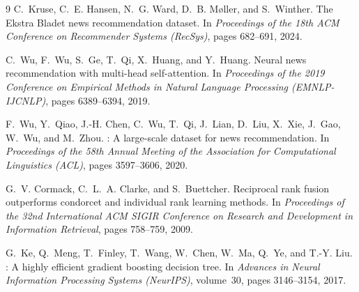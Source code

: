 \documentclass[11pt,a4paper]{article}
\begin{document}
\vspace{-4pt}
\begin{thebibliography}{9}
\footnotesize
\setlength{\itemsep}{0pt}
\setlength{\parskip}{0pt}
C.~Kruse, C.~E. Hansen, N.~G. Ward, D.~B. M{\o}ller, and S.~Winther.
\newblock The {E}kstra {B}ladet news recommendation dataset.
\newblock In \emph{Proceedings of the 18th ACM Conference on Recommender Systems (RecSys)}, pages 682--691, 2024.

C.~Wu, F.~Wu, S.~Ge, T.~Qi, X.~Huang, and Y.~Huang.
\newblock Neural news recommendation with multi-head self-attention.
\newblock In \emph{Proceedings of the 2019 Conference on Empirical Methods in Natural Language Processing (EMNLP-IJCNLP)}, pages 6389--6394, 2019.

F.~Wu, Y.~Qiao, J.-H. Chen, C.~Wu, T.~Qi, J.~Lian, D.~Liu, X.~Xie, J.~Gao, W.~Wu, and M.~Zhou.
: A large-scale dataset for news recommendation.
\newblock In \emph{Proceedings of the 58th Annual Meeting of the Association for Computational Linguistics (ACL)}, pages 3597--3606, 2020.

G.~V. Cormack, C.~L.~A. Clarke, and S.~Buettcher.
\newblock Reciprocal rank fusion outperforms condorcet and individual rank learning methods.
\newblock In \emph{Proceedings of the 32nd International ACM SIGIR Conference on Research and Development in Information Retrieval}, pages 758--759, 2009.

G.~Ke, Q.~Meng, T.~Finley, T.~Wang, W.~Chen, W.~Ma, Q.~Ye, and T.-Y. Liu.
: A highly efficient gradient boosting decision tree.
\newblock In \emph{Advances in Neural Information Processing Systems (NeurIPS)}, volume~30, pages 3146--3154, 2017.

\end{thebibliography}
\end{document}
